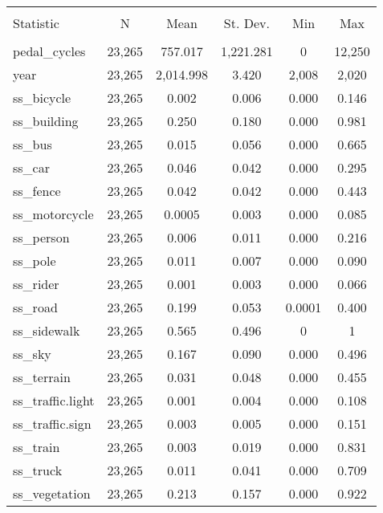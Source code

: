 
\begin{table}[!htbp] \centering 
  \caption{} 
  \label{} 
\begin{tabular}{@{\extracolsep{5pt}}lccccc} 
\\[-1.8ex]\hline 
\hline \\[-1.8ex] 
Statistic & \multicolumn{1}{c}{N} & \multicolumn{1}{c}{Mean} & \multicolumn{1}{c}{St. Dev.} & \multicolumn{1}{c}{Min} & \multicolumn{1}{c}{Max} \\ 
\hline \\[-1.8ex] 
pedal\_cycles & 23,265 & 757.017 & 1,221.281 & 0 & 12,250 \\ 
year & 23,265 & 2,014.998 & 3.420 & 2,008 & 2,020 \\ 
ss\_bicycle & 23,265 & 0.002 & 0.006 & 0.000 & 0.146 \\ 
ss\_building & 23,265 & 0.250 & 0.180 & 0.000 & 0.981 \\ 
ss\_bus & 23,265 & 0.015 & 0.056 & 0.000 & 0.665 \\ 
ss\_car & 23,265 & 0.046 & 0.042 & 0.000 & 0.295 \\ 
ss\_fence & 23,265 & 0.042 & 0.042 & 0.000 & 0.443 \\ 
ss\_motorcycle & 23,265 & 0.0005 & 0.003 & 0.000 & 0.085 \\ 
ss\_person & 23,265 & 0.006 & 0.011 & 0.000 & 0.216 \\ 
ss\_pole & 23,265 & 0.011 & 0.007 & 0.000 & 0.090 \\ 
ss\_rider & 23,265 & 0.001 & 0.003 & 0.000 & 0.066 \\ 
ss\_road & 23,265 & 0.199 & 0.053 & 0.0001 & 0.400 \\ 
ss\_sidewalk & 23,265 & 0.565 & 0.496 & 0 & 1 \\ 
ss\_sky & 23,265 & 0.167 & 0.090 & 0.000 & 0.496 \\ 
ss\_terrain & 23,265 & 0.031 & 0.048 & 0.000 & 0.455 \\ 
ss\_traffic.light & 23,265 & 0.001 & 0.004 & 0.000 & 0.108 \\ 
ss\_traffic.sign & 23,265 & 0.003 & 0.005 & 0.000 & 0.151 \\ 
ss\_train & 23,265 & 0.003 & 0.019 & 0.000 & 0.831 \\ 
ss\_truck & 23,265 & 0.011 & 0.041 & 0.000 & 0.709 \\ 
ss\_vegetation & 23,265 & 0.213 & 0.157 & 0.000 & 0.922 \\ 

\end{tabular}
\end{table}
